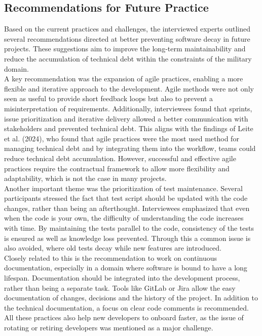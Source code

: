 \subsection{Recommendations for Future Practice}
Based on the current practices and challenges, the interviewed experts outlined several recommendations directed at better preventing software decay in future projects. These suggestions aim to improve the long-term maintainability
and reduce the accumulation of technical debt within the constraints of the military domain.\\

A key recommendation was the expansion of agile practices, enabling a more flexible and iterative approach to the development. Agile methods were not only seen as useful to provide short feedback loops but also to prevent a misinterpretation of requirements.
Additionally, interviewees found that sprints, issue prioritization and iterative delivery allowed a better communication with stakeholders and prevented technical debt.
This aligns with the findings of Leite et al. (2024), who found that agile practices were the most used method for managing technical debt and by integrating them into the workflow, teams could reduce technical debt accumulation.
However, successful and effective agile practices require the contractual framework to allow more flexibility and adaptability, which is not the case in many projects.\\

Another important theme was the prioritization of test maintenance. Several participants stressed the fact that test script should be updated with the code changes, rather than being an afterthought.
Interviewees emphasized that even when the code is your own, the difficulty of understanding the code increases with time. By maintaining the tests parallel to the code, consistency of the tests is ensured as well as knowledge loss prevented.
Through this a common issue is also avoided, where old tests decay while new features are introduced.\\

Closely related to this is the recommendation to work on continuous documentation, especially in a domain where software is bound to have a long lifespan. Documentation should be integrated into the development process, rather than being a separate task.
Tools like GitLab or Jira allow the easy documentation of changes, decisions and the history of the project. In addition to the technical documentation, a focus on clear code comments is recommended.
All these practices also help new developers to onboard faster, as the issue of rotating or retiring developers was mentioned as a major challenge.\\

